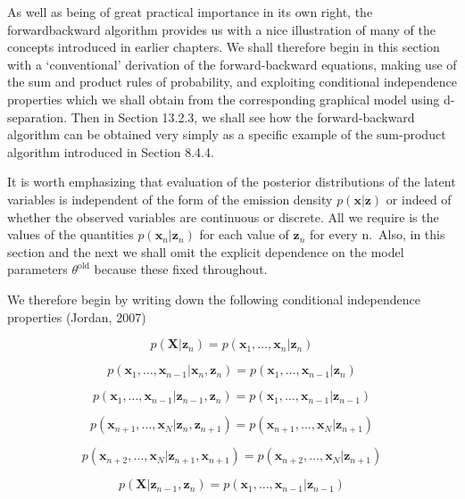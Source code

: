 \documentclass[
  10
]{article}
\begin{document}
As well as being of great practical importance in its own right, the
forwardbackward algorithm provides us with a nice illustration of many
of the concepts introduced in earlier chapters. We shall therefore begin
in this section with a `conventional' derivation of the forward-backward
equations, making use of the sum and product rules of probability, and
exploiting conditional independence properties which we shall obtain
from the corresponding graphical model using d-separation. Then in
Section 13.2.3, we shall see how the forward-backward algorithm can be
obtained very simply as a specific example of the sum-product algorithm
introduced in Section 8.4.4.

It is worth emphasizing that evaluation of the posterior distributions
of the latent variables is independent of the form of the emission
density \(p ( \mathbf { x } | \mathbf { z } )\) or indeed of whether the
observed variables are continuous or discrete. All we require is the
values of the quantities
\(p ( \mathbf { x } _ { n } | \mathbf { z } _ { n } )\) for each value
of \(\mathbf { z } _ { n }\) for every n.~Also, in this section and the
next we shall omit the explicit dependence on the model parameters
\(\theta ^ { \mathrm { o l d } }\) because these fixed throughout.

We therefore begin by writing down the following conditional
independence properties (Jordan, 2007)

\[
{p (\mathbf {X} | \mathbf {z} _ {n})} = {p (\mathbf {x} _ {1}, \ldots , \mathbf {x} _ {n} | \mathbf {z} _ {n})}\tag{13.24}
\]

\[
{p (\mathbf {x} _ {1}, \ldots , \mathbf {x} _ {n - 1} | \mathbf {x} _ {n}, \mathbf {z} _ {n})} = {p (\mathbf {x} _ {1}, \ldots , \mathbf {x} _ {n - 1} | \mathbf {z} _ {n})}\tag{13.25}
\]

\[
{p (\mathbf {x} _ {1}, \ldots , \mathbf {x} _ {n - 1} | \mathbf {z} _ {n - 1}, \mathbf {z} _ {n})} = {p (\mathbf {x} _ {1}, \ldots , \mathbf {x} _ {n - 1} | \mathbf {z} _ {n - 1})}\tag{13.26}
\]

\[
{p (\mathbf {x} _ {n + 1}, \ldots , \mathbf {x} _ {N} | \mathbf {z} _ {n}, \mathbf {z} _ {n + 1})} = {p (\mathbf {x} _ {n + 1}, \ldots , \mathbf {x} _ {N} | \mathbf {z} _ {n + 1})}\tag{13.27}
\]

\[
{p (\mathbf {x} _ {n + 2}, \ldots , \mathbf {x} _ {N} | \mathbf {z} _ {n + 1}, \mathbf {x} _ {n + 1})} = {p (\mathbf {x} _ {n + 2}, \ldots , \mathbf {x} _ {N} | \mathbf {z} _ {n + 1})}\tag{13.28}
\]

\[
{p (\mathbf {X} | \mathbf {z} _ {n - 1}, \mathbf {z} _ {n})} = {p (\mathbf {x} _ {1}, \ldots , \mathbf {x} _ {n - 1} | \mathbf {z} _ {n - 1})}
\]
\end{document}
